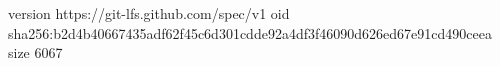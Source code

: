 version https://git-lfs.github.com/spec/v1
oid sha256:b2d4b40667435adf62f45c6d301cdde92a4df3f46090d626ed67e91cd490ceea
size 6067
